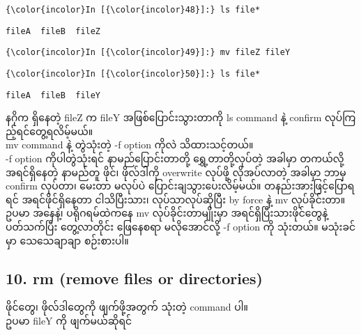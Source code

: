 \documentclass[11pt]{article}
\begin{document}
    \begin{Verbatim}[commandchars=\\\{\}]
{\color{incolor}In [{\color{incolor}48}]:} ls file*
\end{Verbatim}

    \begin{Verbatim}[commandchars=\\\{\}]
fileA  fileB  fileZ

    \end{Verbatim}

    \begin{Verbatim}[commandchars=\\\{\}]
{\color{incolor}In [{\color{incolor}49}]:} mv fileZ fileY
\end{Verbatim}

    \begin{Verbatim}[commandchars=\\\{\}]
{\color{incolor}In [{\color{incolor}50}]:} ls file*
\end{Verbatim}

    \begin{Verbatim}[commandchars=\\\{\}]
fileA  fileB  fileY

    \end{Verbatim}

    နဂိုက ရှိနေတဲ့ fileZ က fileY အဖြစ်ပြောင်းသွားတာကို ls command နဲ့
confirm လုပ်ကြည့်ရင်တွေ့ရလိမ့်မယ်။\\
mv command နဲ့ တွဲသုံးတဲ့ -f option ကိုလဲ သိထားသင့်တယ်။\\
-f option ကိုပါတွဲသုံးရင် နာမည်ပြောင်းတာတို့ ရွှေ့တာတို့လုပ်တဲ့ အခါမှာ
တကယ်လို့ အရင်ရှိနေတဲ့ နာမည်တူ ဖိုင်၊ ဖိုလ်ဒါကို overwrite လုပ်ဖို့
လိုအပ်လာတဲ့ အခါမှာ ဘာမှ confirm လုပ်တာ၊ မေးတာ မလုပ်ပဲ
ပြောင်းချသွားပေးလိမ့်မယ်။ တနည်းအားဖြင့်ပြောရရင် အရင်ဖိုင်ရှိနေတာ
ငါသိပြီးသား၊ လုပ်သာလုပ်ဆိုပြီး by force နဲ့ mv လုပ်ခိုင်းတာ။\\
ဥပမာ အနေနဲ့၊ ပရိုဂရမ်ထဲကနေ mv လုပ်ခိုင်းတာမျိုးမှာ
အရင်ရှိပြီးသားဖိုင်တွေနဲ့ ပတ်သက်ပြီး တွေ့လာတိုင်း ဖြေနေစရာ မလိုအောင်လို့
-f option ကို သုံးတယ်။ မသုံးခင်မှာ သေသေချာချာ စဉ်းစားပါ။

\subsection{10. rm (remove files or
directories)}\label{rm-remove-files-or-directories}

ဖိုင်တွေ၊ ဖိုလ်ဒါတွေကို ဖျက်ဖို့အတွက် သုံးတဲ့ command ပါ။\\
ဥပမာ fileY ကို ဖျက်မယ်ဆိုရင်
\end{document}
